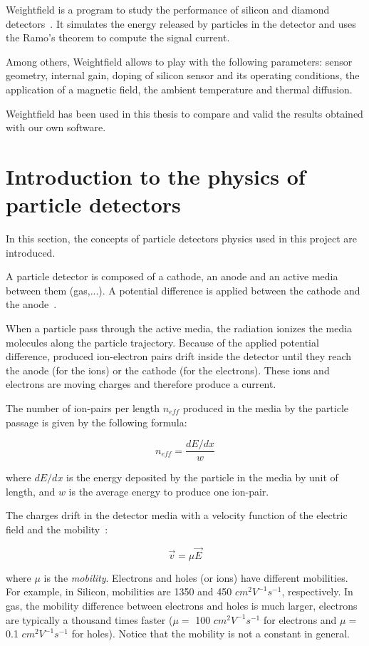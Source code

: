 \documentclass[11pt]{article}
\begin{document}
Weightfield is a program to study the performance of silicon and diamond
detectors~\cite{Cenna2015}. It simulates the energy released by particles in the detector
and uses the Ramo's theorem to compute the signal current.

Among others, Weightfield allows to play with the following parameters:
sensor geometry, internal gain, doping of silicon sensor and its operating
conditions, the application of a magnetic field, the ambient temperature and
thermal diffusion.

Weightfield has been used in this thesis to compare and valid the results
obtained with our own software.

\section{Introduction to the physics of particle detectors}

In this section, the concepts of particle detectors physics used in this project
are introduced.

A particle detector is composed of a cathode, an anode and an active media
between them (gas,...). A potential difference is applied between the cathode
and the anode~\cite{lphy2236}.

When a particle pass through the active media, the radiation ionizes the media
molecules along the particle trajectory.
Because of the applied potential difference,
produced ion-electron pairs drift inside the detector until they reach the anode
(for the ions) or the cathode (for the electrons). These ions and electrons
are moving charges and therefore produce a current.

The number of ion-pairs per length $n_{eff}$ produced in the media by the
particle passage is given by the following formula:

\[n_{eff} = \frac{dE/dx}{w} \]

where $dE/dx$ is the energy deposited by the particle in the media by
unit of length, and $w$ is the average energy to produce one ion-pair.

The charges drift in the detector media with a velocity function of the electric
field and the mobility~\cite{spieler2005semiconductor}:

\[\vec{v} = \mu \vec{E}\]

where $\mu$ is the \textit{mobility}. Electrons and holes (or ions) have different
mobilities. For example, in Silicon, mobilities are 1350 and 450 $cm^2V^{-1}s^{-1}$,
respectively. In gas, the mobility difference between electrons and holes is
much larger, electrons are typically a thousand times faster ($\mu =$ 100 $cm^2V^{-1}s^{-1}$
for electrons and $\mu =$ 0.1 $cm^2V^{-1}s^{-1}$ for holes). Notice that the mobility
is not a constant in general.
\end{document}
